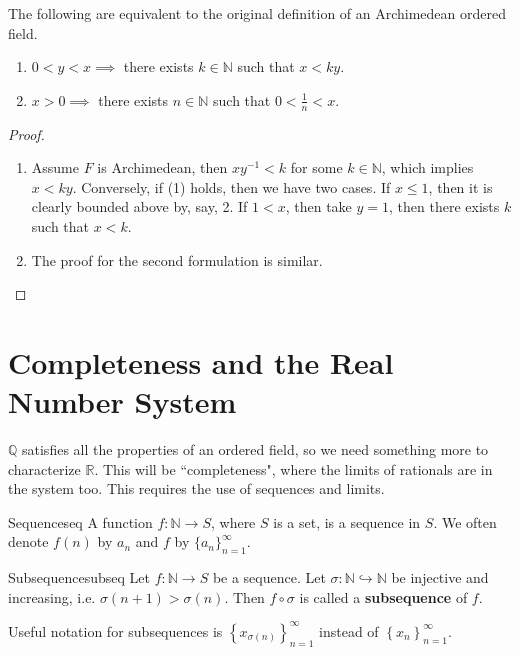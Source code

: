 \documentclass[10pt]{report}
\begin{document}
\begin{prop}
	The following are equivalent to the original definition of an Archimedean ordered field.
	\begin{enumerate}
		\item $0<y<x \implies$ there exists $k \in \mathbb{N}$ such that $x < ky$.
		\item $x > 0 \implies$ there exists $n \in \mathbb{N}$ such that $0 < \frac{1}{n} < x$.
	\end{enumerate}
\end{prop}
\begin{proof}
	\begin{enumerate}
		\item Assume $F$ is Archimedean, then $x y^{-1}<k$ for some $k \in \mathbb{N}$, which implies $x < ky$. Conversely, if (1) holds, then we have two cases. If $x \leq 1$, then it is clearly bounded above by, say, 2. If $1 < x$, then take $y=1$, then there exists $k$ such that $x < k$.
		\item The proof for the second formulation is similar.
	\end{enumerate}
\end{proof}

\section{Completeness and the Real Number System}

$\mathbb{Q}$ satisfies all the properties of an ordered field, so we need something more to characterize $\mathbb{R}$. This will be ``completeness", where the limits of rationals are in the system too. This requires the use of sequences and limits.

\begin{defn}{Sequence}{seq}
	A function $f:\mathbb{N} \to S$, where $S$ is a set, is a sequence in $S$. We often denote $f(n)$ by $a_n$ and $f$ by $\{a_n\}_{n=1}^\infty$.
\end{defn}

\begin{defn}{Subsequence}{subseq}
	Let $f:\mathbb{N}\to S$ be a sequence. Let $ \sigma:\mathbb{N} \hookrightarrow \mathbb{N}$ be injective and increasing, i.e. $\sigma(n+1) > \sigma(n)$. Then $f \circ \sigma$ is called a \textbf{subsequence} of $f$.
\end{defn}

Useful notation for subsequences is $\left\{ x_{\sigma(n)} \right\}_{n=1}^\infty$ instead of $\left\{ x_{n} \right\}_{n=1}^\infty$.
\end{document}
